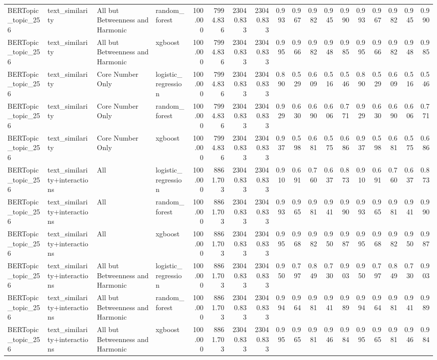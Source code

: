 \begin{tabular}{llllrrrrrrrrrrrrrr}
BERTopic_topic_256 & text_similarity & All but Betweenness and Harmonic & random_forest & 100.000 & 7994.836 & 23040.833 & 23040.833 & 0.993 & 0.967 & 0.982 & 0.945 & 0.990 & 0.993 & 0.967 & 0.982 & 0.945 & 0.990 \\
BERTopic_topic_256 & text_similarity & All but Betweenness and Harmonic & xgboost & 100.000 & 7994.836 & 23040.833 & 23040.833 & 0.995 & 0.966 & 0.982 & 0.948 & 0.985 & 0.995 & 0.966 & 0.982 & 0.948 & 0.985 \\
BERTopic_topic_256 & text_similarity & Core Number Only & logistic_regression & 100.000 & 7994.836 & 23040.833 & 23040.833 & 0.890 & 0.529 & 0.609 & 0.516 & 0.546 & 0.890 & 0.529 & 0.609 & 0.516 & 0.546 \\
BERTopic_topic_256 & text_similarity & Core Number Only & random_forest & 100.000 & 7994.836 & 23040.833 & 23040.833 & 0.929 & 0.630 & 0.690 & 0.606 & 0.771 & 0.929 & 0.630 & 0.690 & 0.606 & 0.771 \\
BERTopic_topic_256 & text_similarity & Core Number Only & xgboost & 100.000 & 7994.836 & 23040.833 & 23040.833 & 0.937 & 0.598 & 0.681 & 0.575 & 0.686 & 0.937 & 0.598 & 0.681 & 0.575 & 0.686 \\
BERTopic_topic_256 & text_similarity+interactions & All & logistic_regression & 100.000 & 8861.703 & 23040.833 & 23040.833 & 0.910 & 0.691 & 0.760 & 0.637 & 0.873 & 0.910 & 0.691 & 0.760 & 0.637 & 0.873 \\
BERTopic_topic_256 & text_similarity+interactions & All & random_forest & 100.000 & 8861.703 & 23040.833 & 23040.833 & 0.993 & 0.965 & 0.981 & 0.941 & 0.990 & 0.993 & 0.965 & 0.981 & 0.941 & 0.990 \\
BERTopic_topic_256 & text_similarity+interactions & All & xgboost & 100.000 & 8861.703 & 23040.833 & 23040.833 & 0.995 & 0.968 & 0.982 & 0.950 & 0.987 & 0.995 & 0.968 & 0.982 & 0.950 & 0.987 \\
BERTopic_topic_256 & text_similarity+interactions & All but Betweenness and Harmonic & logistic_regression & 100.000 & 8861.703 & 23040.833 & 23040.833 & 0.950 & 0.797 & 0.849 & 0.730 & 0.903 & 0.950 & 0.797 & 0.849 & 0.730 & 0.903 \\
BERTopic_topic_256 & text_similarity+interactions & All but Betweenness and Harmonic & random_forest & 100.000 & 8861.703 & 23040.833 & 23040.833 & 0.994 & 0.964 & 0.981 & 0.941 & 0.989 & 0.994 & 0.964 & 0.981 & 0.941 & 0.989 \\
BERTopic_topic_256 & text_similarity+interactions & All but Betweenness and Harmonic & xgboost & 100.000 & 8861.703 & 23040.833 & 23040.833 & 0.995 & 0.965 & 0.981 & 0.946 & 0.984 & 0.995 & 0.965 & 0.981 & 0.946 & 0.984 \\

\end{tabular}
